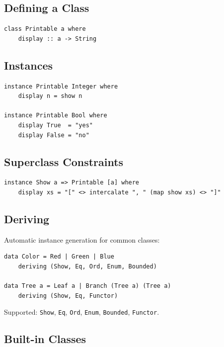 \documentclass[11pt,a4paper]{article}
\begin{document}
\subsection{Defining a Class}

\begin{lstlisting}
class Printable a where
    display :: a -> String
\end{lstlisting}

\subsection{Instances}

\begin{lstlisting}
instance Printable Integer where
    display n = show n

instance Printable Bool where
    display True  = "yes"
    display False = "no"
\end{lstlisting}

\subsection{Superclass Constraints}

\begin{lstlisting}
instance Show a => Printable [a] where
    display xs = "[" <> intercalate ", " (map show xs) <> "]"
\end{lstlisting}

\subsection{Deriving}

Automatic instance generation for common classes:

\begin{lstlisting}
data Color = Red | Green | Blue
    deriving (Show, Eq, Ord, Enum, Bounded)

data Tree a = Leaf a | Branch (Tree a) (Tree a)
    deriving (Show, Eq, Functor)
\end{lstlisting}

Supported: \texttt{Show}, \texttt{Eq}, \texttt{Ord}, \texttt{Enum},
\texttt{Bounded}, \texttt{Functor}.

\subsection{Built-in Classes}
\end{document}
